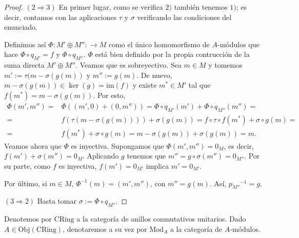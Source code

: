 \documentclass[../main.tex]{subfiles}
\begin{document}
\begin{proof}
	$(2\Rightarrow 3)$ En primer lugar, como se verifica $2)$ también tenemos $1)$; es decir, contamos con las aplicaciones $\tau$ y $\sigma$ verificando las condiciones del enunciado.

	Definimos así $\Phi:M'\oplus M'':\longrightarrow M$ como el único homomorfismo de $A$-módulos que hace $\Phi\circ q_{M'}=f$ y $\Phi\circ q_{M''}$. $\Phi$ está bien definido por la propia contrucción de la suma directa $M'\oplus M''$.
	Veamos que es sobreyectivo. Sea $m\in M$ y tomemos $m':=\tau(m-\sigma(g(m))$ y $m'':=g(m)$. De nuevo, $m-\sigma(g(m))\in\ker(g)=\text{im}(f)$ y existe $m^*\in M'$ tal que $f(m^*)=m-\sigma(g(m))$. Por esto,
	\begin{align*}
		\Phi(m',m'')=&\Phi((m',0)+(0,m''))=\Phi\circ q_{M'}(m')+\Phi\circ q_{M''}(m'')=\\
		=&f(\tau(m-\sigma(g(m))))+\sigma(g(m))=f\circ\tau\circ f(m^*)+\sigma\circ g(m)=\\
		=&f(m^*)+\sigma\circ g(m)=m-\sigma(g(m))+\sigma(g(m))=m.
	\end{align*}
	Veamos ahora que $\Phi$ es inyectiva. Supongamos que $\Phi(m',m'')=0_M$, es decir, $f(m')+\sigma(m'')=0_M$. Aplicando $g$ tenemos que $m''=g\circ\sigma(m'')=0_{M''}$. Por su parte, como $f$ es inyectiva, $f(m')=0_{M'}$ implica $m'=0_{M'}$.

	Por último, si $m\in M$, $\Phi^{-1}(m)=(m',m'')$, con $m''=g(m)$. Así, ${p_{M''}}^{-1}=g$.

	$(3\Rightarrow 2)$ Basta tomar $\sigma:= \Phi\circ q_{M''}$.
\end{proof}

Denotemos por $\text{CRing}$ a la categoría de anillos conmutativos unitarios. Dado $A\in\text{Obj}(\text{CRing})$, denotaremos a su vez por $\text{Mod}_A$ a la categoría de $A$-módulos.
\end{document}
